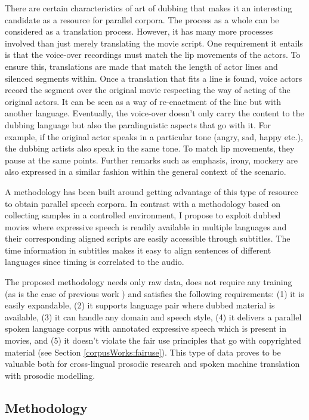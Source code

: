 There are certain characteristics of art of dubbing that makes it an interesting candidate as a resource for parallel corpora. The process as a whole can be considered as a translation process. However, it has many more processes involved than just merely translating the movie script. One requirement it entails is that the voice-over recordings must match the lip movements of the actors. To ensure this, translations are made that match the length of actor lines and silenced segments within. Once a translation that fits a line is found, voice actors record the segment over the original movie respecting the way of acting of the original actors. It can be seen as a way of re-enactment of the line but with another language. Eventually, the voice-over doesn't only carry the content to the dubbing language but also the paralinguistic aspects that go with it. For example, if the original actor speaks in a particular tone (angry, sad, happy etc.), the dubbing artists also speak in the same tone. To match lip movements, they pause at the same points. Further remarks such as emphasis, irony, mockery are also expressed in a similar fashion within the general context of the scenario.  

A methodology has been built around getting advantage of this type of resource to obtain parallel speech corpora. In contrast with a methodology based on collecting samples in a controlled environment, I propose to exploit dubbed movies where expressive speech is readily available in multiple languages and their corresponding aligned scripts are easily accessible through subtitles. The time information in subtitles makes it easy to align sentences of different languages since timing is correlated to the audio. 

The proposed methodology needs only raw data, does not require any training (as is the case of previous work \citep{tsiartas2011bilingual}) and satisfies the following requirements: (1) it is easily expandable, (2) it supports language pair where dubbed material is available, (3) it can handle any domain and speech style, (4) it delivers a parallel spoken language corpus with annotated expressive speech which is present in movies, and (5) it doesn't violate the fair use principles that go with copyrighted material (see Section \ref{corpusWorks:fairuse}). This type of data proves to be valuable both for cross-lingual prosodic research and spoken machine translation with prosodic modelling. 

\subsection{Methodology}

